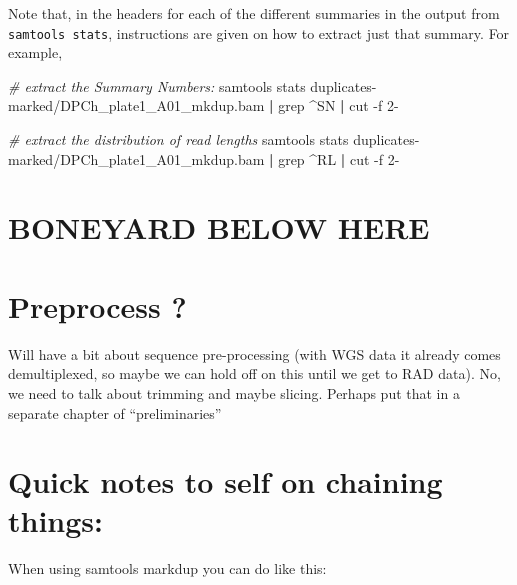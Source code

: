 \documentclass[]{krantz}
\makeatletter
\newenvironment{Shaded}{\begin{snugshade}}{\end{snugshade}}
\newcommand{\CommentTok}[1]{\textcolor[rgb]{0.37,0.37,0.37}{\textit{#1}}}
\newcommand{\ExtensionTok}[1]{#1}
\newcommand{\FunctionTok}[1]{\textcolor[rgb]{0,0,0}{#1}}
\newcommand{\KeywordTok}[1]{\textcolor[rgb]{0.27,0.27,0.27}{\textbf{#1}}}
\newcommand{\NormalTok}[1]{#1}
\newenvironment{kframe}{%
\medskip{}
\setlength{\fboxsep}{.8em}
 \def\at@end@of@kframe{}%
 \ifinner\ifhmode%
  \def\at@end@of@kframe{\end{minipage}}%
  \begin{minipage}{\columnwidth}%
 \fi\fi%
 \def\FrameCommand##1{\hskip\@totalleftmargin \hskip-\fboxsep
 \colorbox{shadecolor}{##1}\hskip-\fboxsep
     \hskip-\linewidth \hskip-\@totalleftmargin \hskip\columnwidth}%
 \MakeFramed {\advance\hsize-\width
   \@totalleftmargin\z@ \linewidth\hsize
   \@setminipage}}%
 {\par\unskip\endMakeFramed%
 \at@end@of@kframe}
\renewenvironment{Shaded}{\begin{kframe}}{\end{kframe}}
\makeatother
\begin{document}
Note that, in the headers for each of the different summaries in the output
from \texttt{samtools\ stats}, instructions are given on how to extract just that
summary. For example,

\begin{Shaded}
\begin{Highlighting}[]
\CommentTok{# extract the Summary Numbers:}
\ExtensionTok{samtools}\NormalTok{ stats duplicates-marked/DPCh_plate1_A01_mkdup.bam }\KeywordTok{|} \FunctionTok{grep}\NormalTok{ ^SN }\KeywordTok{|} \FunctionTok{cut}\NormalTok{ -f 2-}

\CommentTok{# extract the distribution of read lengths}
\ExtensionTok{samtools}\NormalTok{ stats duplicates-marked/DPCh_plate1_A01_mkdup.bam }\KeywordTok{|} \FunctionTok{grep}\NormalTok{ ^RL }\KeywordTok{|} \FunctionTok{cut}\NormalTok{ -f 2-}
\end{Highlighting}
\end{Shaded}

\hypertarget{boneyard-below-here}{%
\section{BONEYARD BELOW HERE}\label{boneyard-below-here}}

\hypertarget{preprocess}{%
\section{Preprocess ?}\label{preprocess}}

Will have a bit about sequence pre-processing (with WGS data it already
comes demultiplexed, so maybe we can hold off on this until we get to
RAD data). No, we need to talk about trimming and maybe slicing. Perhaps
put that in a separate chapter of ``preliminaries''

\hypertarget{quick-notes-to-self-on-chaining-things}{%
\section{Quick notes to self on chaining things:}\label{quick-notes-to-self-on-chaining-things}}

When using samtools markdup you can do like this:
\end{document}
